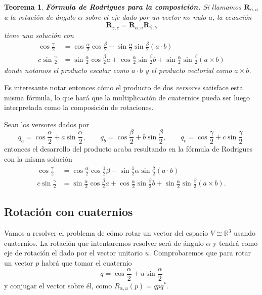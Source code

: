 \documentclass{article}
\theoremstyle{plain}
\newtheorem{theorem}{Teorema}
\theoremstyle{definition}
\theoremstyle{remark}
\begin{document}
\begin{theorem}
  \textbf{Fórmula de Rodrigues para la composición.} Si llamamos
  $\mathbf{R}_{\alpha,a}$ a la rotación de ángulo $\alpha$ sobre el
  eje dado por un vector no nulo $a$, la ecuación
  \[\mathbf{R}_{\gamma,c} =\mathbf{R}_{\alpha,a}\mathbf{R}_{\beta,b}\]
  tiene una solución con
  \[\begin{aligned}
    \cos \frac{\gamma}{2} &=
    \cos \frac{\alpha}{2} \cos\frac{\beta}{2} - \sin\frac{\alpha}{2}\sin\frac{\beta}{2} (a\cdot b)\\
    c \sin \frac{\gamma}{2} &=
    \sin \frac{\alpha}{2} \cos\frac{\beta}{2} a +
    \cos \frac{\alpha}{2} \sin\frac{\beta}{2} b +
    \sin \frac{\alpha}{2} \sin\frac{\beta}{2} (a \times b)
  \end{aligned}\]
  donde notamos el producto escalar como $a\cdot b$ y el producto vectorial como $a \times b$.
  \cite{vince11}
\end{theorem}

Es interesante notar entonces cómo el producto de dos \textit{versores}
satisface esta misma fórmula, lo que hará que la multiplicación de
cuaternios pueda ser luego interpretada como la composición de
rotaciones.

Sean los versores dados por
\[
  q_a = \cos \frac{\alpha}{2}  + a \sin \frac{\alpha}{2} ,
  \qquad
  q_b = \cos \frac{\beta}{2} + b \sin \frac{\beta}{2},
  \qquad
  q_c = \cos \frac{\gamma}{2}  + c \sin \frac{\gamma}{2} .
\]
entonces el desarrollo del producto acaba resultando en la fórmula de
Rodrigues con la misma solución
\[\begin{aligned}
    \cos \frac{\gamma}{2} &=
    \cos \frac{\alpha}{2} \cos\frac{1}{2}\beta - \sin\frac{1}{2}\alpha\sin\frac{\beta}{2} (a\cdot b)\\
    c\sin \frac{\gamma}{2} &=
    \sin \frac{\alpha}{2} \cos\frac{\beta}{2} a +
    \cos \frac{\alpha}{2} \sin\frac{\beta}{2} b +
    \sin \frac{\alpha}{2} \sin\frac{\beta}{2} (a \times b).
  \end{aligned}\]

\subsection{Rotación con cuaternios}
Vamos a resolver el problema de cómo rotar un vector del espacio
$V \cong \mathbb{R}^3$ usando cuaternios. La rotación que intentaremos
resolver será de ángulo $\alpha$ y tendrá como eje de rotación el dado
por el vector unitario $u$. Comprobaremos que para rotar un vector $p$
habrá que tomar el cuaternio
\[q = \cos \frac{\alpha}{2} + u \sin \frac{\alpha}{2}\]
y conjugar el vector sobre él, como $R_{\alpha,u}(p) = qpq^\ast $.
\end{document}
